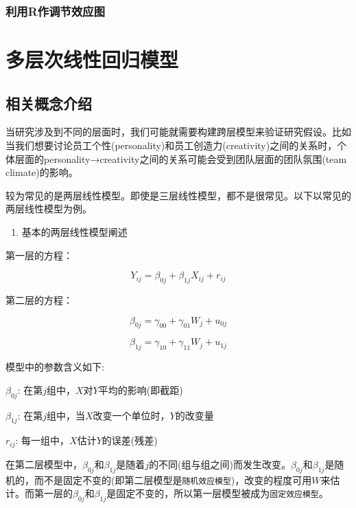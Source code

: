 \documentclass[
]{book}
\providecommand{\tightlist}{%
  \setlength{\itemsep}{0pt}\setlength{\parskip}{0pt}}
\begin{document}
\hypertarget{ux5229ux7528rux4f5cux8c03ux8282ux6548ux5e94ux56fe}{%
\subsection{利用R作调节效应图}\label{ux5229ux7528rux4f5cux8c03ux8282ux6548ux5e94ux56fe}}

\hypertarget{multilevel}{%
\chapter{多层次线性回归模型}\label{multilevel}}

\hypertarget{multiconcept}{%
\section{相关概念介绍}\label{multiconcept}}

当研究涉及到不同的层面时，我们可能就需要构建跨层模型来验证研究假设。比如当我们想要讨论员工个性(personality)和员工创造力(creativity)之间的关系时，个体层面的personality→creativity之间的关系可能会受到团队层面的团队氛围(team climate)的影响。

较为常见的是两层线性模型。即使是三层线性模型，都不是很常见。以下以常见的两层线性模型为例。

\begin{enumerate}
\def\labelenumi{\arabic{enumi}.}
\tightlist
\item
  基本的两层线性模型阐述
\end{enumerate}

第一层的方程：

\[
Y_{ij} = \beta_{0j} + \beta_{1j}X_{ij} + r_{ij}
\]

第二层的方程：

\[
\beta_{0j} = \gamma_{00} + \gamma_{01}W_j + u_{0j}
\]

\[
\beta_{1j} = \gamma_{10} + \gamma_{11}W_j + u_{1j}
\]

模型中的参数含义如下:

\(\beta_{0j}\): 在第\(j\)组中，\(X\)对\(Y\)平均的影响(即截距)

\(\beta_{1j}\): 在第\(j\)组中，当\(X\)改变一个单位时，\(Y\)的改变量

\(r_{ij}\): 每一组中，\(X\)估计\(Y\)的误差(残差)

在第二层模型中，\(\beta_{0j}\)和\(\beta_{1j}\)是随着\(j\)的不同(组与组之间)而发生改变。\(\beta_{0j}\)和\(\beta_{1j}\)是随机的，而不是固定不变的(即第二层模型是\texttt{随机效应模型})，改变的程度可用\(W\)来估计。而第一层的\(\beta_{0j}\)和\(\beta_{1j}\)是固定不变的，所以第一层模型被成为\texttt{固定效应模型}。
\end{document}
